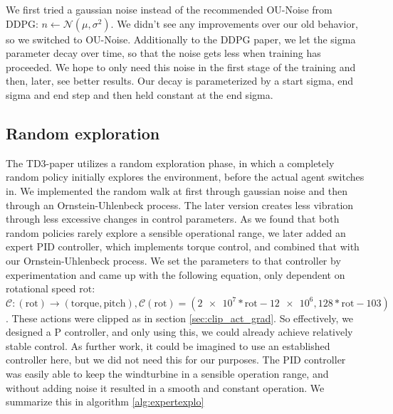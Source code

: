 \documentclass[hyperref,beleg]{cgvpub}
\begin{document}
We first tried a gaussian noise instead of the recommended \ac{OU-Noise} \cite{uhlenbeckTheoryBrownianMotion1930} from \ac{DDPG}: \(n \leftarrow \mathcal{N}(\mu, \sigma^2) \). We didn't see any improvements over our old behavior, so we switched to \ac{OU-Noise}. Additionally to the \ac{DDPG} paper, we let the sigma parameter decay over time, so that the noise gets less when training has proceeded. We hope to only need this noise in the first stage of the training and then, later, see better results. Our decay is parameterized by a start sigma, end sigma and end step and then held constant at the end sigma.

\subsection{Random exploration}

The TD3-paper \cite{fujimotoAddressingFunctionApproximation2018} utilizes a random exploration phase, in which a completely random policy \cite{mozerDiscoveringStructureReactive1990} initially explores the environment, before the actual agent switches in. We implemented the random walk at first through gaussian noise and then through an Ornstein-Uhlenbeck process. The later version creates less vibration through less excessive changes in control parameters. As we found that both random policies rarely explore a sensible operational range, we later added an expert PID controller, which implements torque control, and combined that with our Ornstein-Uhlenbeck process. We set the parameters to that controller by experimentation and came up with the following equation, only dependent on rotational speed $\mathrm{rot}$: $\mathcal{C}:(\mathrm{rot})\rightarrow(\mathrm{torque}, \mathrm{pitch}), \mathcal{C}(\mathrm{rot}) = (\num{2e7}*\mathrm{rot}-\num{12e6}, 128*\mathrm{rot}-103)$. These actions were clipped as in section \ref{sec:clip_act_grad}. So effectively, we designed a P controller, and only using this, we could already achieve relatively stable control. As further work, it could be imagined to use an established controller here, but we did not need this for our purposes. The PID controller was easily able to keep the windturbine in a sensible operation range, and without adding noise it resulted in a smooth and constant operation. We summarize this in algorithm \ref{alg:expertexplo}
\end{document}
